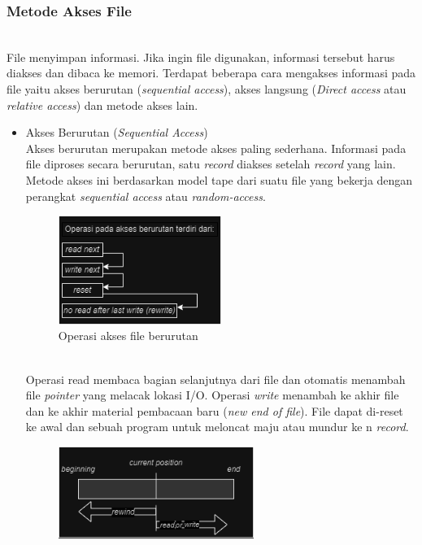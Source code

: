 \documentclass[12pt]{article}
\begin{document}
\subsubsection{Metode Akses File}
\\File menyimpan informasi. Jika ingin file digunakan, informasi tersebut harus diakses dan dibaca ke memori. Terdapat beberapa cara mengakses informasi pada file yaitu akses berurutan (\textit{sequential access}), akses langsung (\textit{Direct access} atau \textit{relative access}) dan metode akses lain.
\begin{itemize}
    \item Akses Berurutan (\textit{Sequential Access})
        \\Akses berurutan merupakan metode akses paling sederhana. Informasi pada file diproses secara berurutan, satu \textit{record} diakses setelah \textit{record} yang lain. Metode akses ini berdasarkan model tape dari suatu file yang bekerja dengan perangkat \textit{sequential access} atau \textit{random-access}.
        \begin{figure}[h]
			\centering
			\includegraphics[width=0.5\textwidth]{asset/gambar1.png}
            \caption{Operasi akses file berurutan}
        \end{figure}
        \\Operasi read membaca bagian selanjutnya dari file dan otomatis menambah file \textit{pointer} yang melacak lokasi I/O. Operasi \textit{write} menambah ke akhir file dan ke akhir material pembacaan baru (\textit{new end of file}). File dapat di-reset ke awal dan sebuah program untuk meloncat maju atau mundur ke n \textit{record}.
        \begin{figure}[h]
			\centering
			\includegraphics[width=0.6\textwidth]{asset/gambar2.png}

\end{figure}
\end{itemize}
\end{document}

